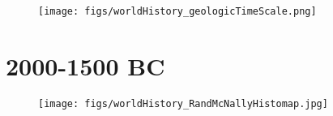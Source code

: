 \begin{frame}[plain]\mypagenum
	\begin{changemargin}{-1.3in}{0in}
	\end{changemargin}
\end{frame}


\begin{frame}[plain]\mypagenum
	\begin{changemargin}{-1.3in}{0in}
		\begin{figure}
			\texttt{[image: figs/worldHistory\_geologicTimeScale.png]}
		\end{figure}
	\end{changemargin}
\end{frame}



\section{2000-1500 BC}
\begin{frame}[plain]\mypagenum
	\begin{changemargin}{-1.3in}{0in}
		\begin{figure}
			\texttt{[image: figs/worldHistory\_RandMcNallyHistomap.jpg]}
		\end{figure}
	\end{changemargin}
\end{frame}

